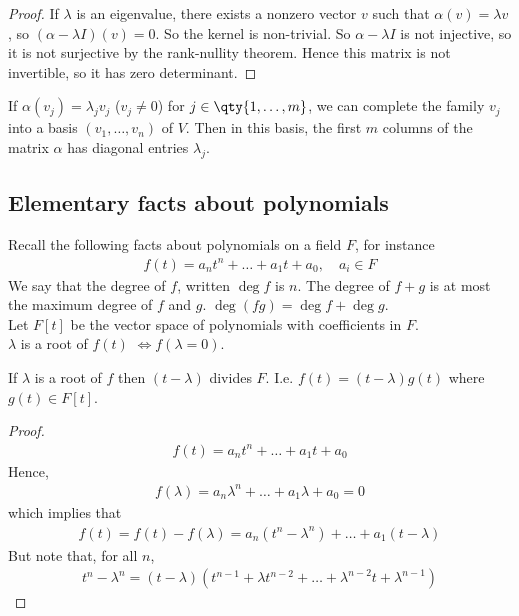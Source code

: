 \begin{proof}
	If $\lambda$ is an eigenvalue, there exists a nonzero vector $v$ such that $\alpha(v) = \lambda v$, so $(\alpha - \lambda I)(v) = 0$.
	So the kernel is non-trivial.
	So $\alpha - \lambda I$ is not injective, so it is not surjective by the rank-nullity theorem.
	Hence this matrix is not invertible, so it has zero determinant.
\end{proof}
\begin{remark}
	If $\alpha(v_j) = \lambda_j v_j$ ($v_j \neq 0$) for $j \in \qty{1, \dots, m}$, we can complete the family $v_j$ into a basis $(v_1, \dots, v_n)$ of $V$.
	Then in this basis, the first $m$ columns of the matrix $\alpha$ has diagonal entries $\lambda_j$.
\end{remark}

\subsection{Elementary facts about polynomials}
Recall the following facts about polynomials on a field $F$, for instance
\begin{align*}
	f(t) = a_n t^n + \dots + a_1 t + a_0, \quad a_i \in F
\end{align*}
We say that the degree of $f$, written $\deg f$ is $n$.
The degree of $f + g$ is at most the maximum degree of $f$ and $g$.
$\deg (fg) = \deg f + \deg g$. \\
Let $F[t]$ be the vector space of polynomials with coefficients in $F$. \\
$\lambda$ is a root of $f(t)$ $\iff f(\lambda = 0)$.

\begin{lemma}
	If $\lambda$ is a root of $f$ then $(t-\lambda)$ divides $F$.
	I.e. $f(t) = (t - \lambda) g(t)$ where $g(t) \in F[t]$.
\end{lemma} 

\begin{proof}
	\begin{align*}
		f(t) = a_n t^n + \dots + a_1 t + a_0
	\end{align*}
	Hence,
	\begin{align*}
		f(\lambda) = a_n \lambda^n + \dots + a_1 \lambda + a_0 = 0
	\end{align*}
	which implies that
	\begin{align*}
		f(t) = f(t) - f(\lambda) = a_n(t^n - \lambda^n) + \dots + a_1(t - \lambda)
	\end{align*}
	But note that, for all $n$,
	\begin{align*}
		t^n - \lambda^n = (t - \lambda)(t^{n-1} + \lambda t^{n-2} + \dots + \lambda^{n-2} t + \lambda^{n-1})
	\end{align*}
\end{proof}

